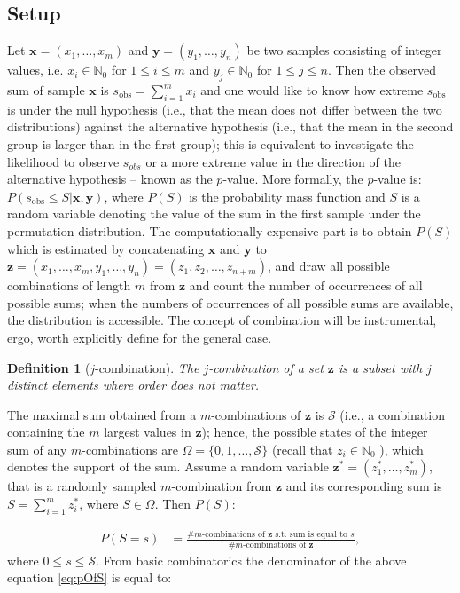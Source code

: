 \documentclass[a4paper,11pt]{article}
\newtheorem{mydef}{Definition}
\begin{document}
\subsection{Setup}
Let $\bm{x}=(x_1,\ldots, x_m)$ and $\bm{y}=(y_1,\ldots,y_n)$ be two samples consisting of integer values, i.e. $x_i \in \mathbb{N}_0$ for $1\leq i \leq m$ and $y_j \in \mathbb{N}_0$ for $1\leq j\leq n$. Then the observed sum of sample $\bm{x}$ is $s_{\text{obs}} = \sum_{i=1}^m x_i$ and one would like to know how extreme $s_{\text{obs}}$ is under the null hypothesis (i.e., that the mean does not differ between the two distributions) against the alternative hypothesis (i.e., that the mean in the second group is larger than in the first group); this is equivalent to investigate the likelihood to observe $s_{obs}$ or a more extreme value in the direction of the alternative hypothesis – known as the $p$-value. More formally, the $p$-value is: $P(s_{\text{obs}} \leq S | \bm{x}, \bm{y})$, where $P(S)$ is the probability mass function and $S$ is a random variable denoting the value of the sum in the first sample under the permutation distribution. The computationally expensive part is to obtain $P(S)$ which is estimated by concatenating $\bm{x}$ and $\bm{y}$ to $\bm{z}=(x_{1},\ldots,x_{m},y_{1},\ldots,y_{n})=(z_1, z_2, \ldots, z_{n+m})$, and draw all possible combinations of length $m$ from $\bm{z}$ and count the number of occurrences of all possible sums; when the numbers of occurrences of all possible sums are available, the distribution is accessible. The concept of combination will be instrumental, ergo, worth explicitly define for the general case.

\begin{mydef}[$j$-combination] The $j$-combination of a set $\bm{z}$ is a subset with $j$ distinct elements where order does not matter.\end{mydef}

The maximal sum obtained from a $m$-combinations of $\bm{z}$ is $\mathcal{S}$ (i.e., a combination containing the $m$ largest values in $\bm{z}$); hence, the possible states of the integer sum of any $m$-combinations are $\Omega=\{0,1,\ldots,\mathcal{S}\}$ (recall that $z_{i}\in \mathbb{N}_0$ ), which denotes the support of the sum. Assume a random variable $\bm{z}^{*}=(z^{*}_1,\ldots,z^{*}_m)$, that is a randomly sampled $m$-combination from $\bm{z}$ and its corresponding sum is $S=\sum_{i=1}^m z^{*}_i$, where $S\in \Omega$. Then $P(S)$:

\begin{align}
\label{eq:pOfS}
P(S = s) &= \frac{\text{\# $m$-combinations of $\bm{z}$ s.t. sum is equal to $s$}}{\text{\# $m$-combinations of $\bm{z}$}},
\end{align}
where $0\leq s \leq \mathcal{S}$. From basic combinatorics the denominator of the above equation \ref{eq:pOfS} is equal to:
\end{document}

